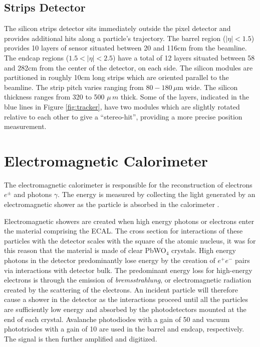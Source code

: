 \subsection{Strips Detector}

The silicon strips detector sits immediately outside the pixel detector and provides additional hits along a particle's trajectory. The barrel region ($|\eta|<1.5$) provides 10 layers of sensor situated between 20 and 116cm from the beamline. The endcap regions ($1.5<|\eta|<2.5$) have a total of 12 layers situated between 58 and 282cm from the center of the detector, on each side. The silicon modules are partitioned in roughly 10cm long strips which are oriented parallel to the beamline. The strip pitch varies ranging from $80-180\,\mu$m wide. The silicon thickness ranges from 320 to 500 $\mu\,m$ thick. Some of the layers, indicated in the blue lines in Figure \ref{fig:tracker}, have two modules which are slightly rotated relative to each other to give a ``stereo-hit'', providing a more precise position measurement.

\section{Electromagnetic Calorimeter}

The electromagnetic calorimeter is responsible for the reconstruction of electrons $e^{\pm}$ and photons $\gamma$. The energy is measured by collecting the light generated by an electromagnetic shower as the particle is absorbed in the calorimeter \cite{ecaltdr, ecaltdradd}. 

Electromagnetic showers are created when high energy photons or electrons enter the material comprising the ECAL. The cross section for interactions of these particles with the detector scales with the square of the atomic nucleus, it was for this reason that the material is made of clear PbWO$_{4}$ crystals. High energy photons in the detector predominantly lose energy by the creation of $e^{+}e^{-}$ pairs via interactions with detector bulk. The predominant energy loss for high-energy electrons is through the emission of \textit{bremsstrahlung}, or electromagnetic radiation created by the scattering of the electrons. An incident particle will therefore cause a shower in the detector as the interactions proceed until all the particles are sufficiently low energy and absorbed by the photodetectors mounted at the end of each crystal. Avalanche photodiodes with a gain of 50 and vacuum phototriodes with a gain of 10 are used in the barrel and endcap, respectively. The signal is then further amplified and digitized.

